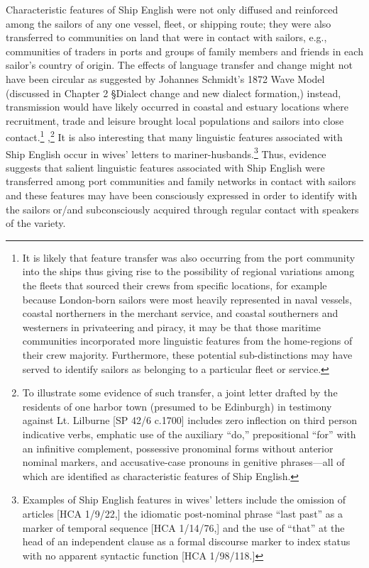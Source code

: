   Characteristic features of Ship English were not only diffused and reinforced among the sailors of any one vessel, fleet, or shipping route; they were also transferred to communities on land that were in contact with sailors, e.g., communities of traders in ports and groups of family members and friends in each sailor’s country of origin. The effects of language transfer and change might not have been circular as suggested by Johannes Schmidt’s 1872 Wave Model (discussed in Chapter 2 §Dialect change and new dialect formation,)  instead, transmission would have likely occurred in coastal and estuary locations where recruitment, trade and leisure brought local populations and sailors into close contact.\footnote{It is likely that feature transfer was also occurring from the port community into the ships thus giving rise to the possibility of regional variations among the fleets that sourced their crews from specific locations, for example because London{}-born sailors were most heavily represented in naval vessels, coastal northerners in the merchant service, and coastal southerners and westerners in privateering and piracy, it may be that those maritime communities incorporated more linguistic features from the home-regions of their crew majority. Furthermore, these potential sub-distinctions may have served to identify sailors as belonging to a particular fleet or service.} ,\footnote{To illustrate some evidence of such transfer, a joint letter drafted by the residents of one harbor town (presumed to be Edinburgh) in testimony against Lt. Lilburne [SP 42/6 c.1700] includes zero inflection on third person indicative verbs, emphatic use of the auxiliary “do,” prepositional “for” with an infinitive complement, possessive pronominal forms without anterior nominal markers, and accusative-case pronouns in genitive phrases—all of which are identified as characteristic features of Ship English.} It is also interesting that many linguistic features associated with Ship English occur in wives’ letters to mariner-husbands.\footnote{Examples of Ship English features in wives’ letters include the omission of articles [HCA 1/9/22,] the idiomatic post-nominal phrase “last past” as a marker of temporal sequence [HCA 1/14/76,] and the use of “that” at the head of an independent clause as a formal discourse marker to index status with no apparent syntactic function [HCA 1/98/118.]} Thus, evidence suggests that salient linguistic features associated with Ship English were transferred among port communities and family networks in contact with sailors and these features may have been consciously expressed in order to identify with the sailors or/and subconsciously acquired through regular contact with speakers of the variety.  

